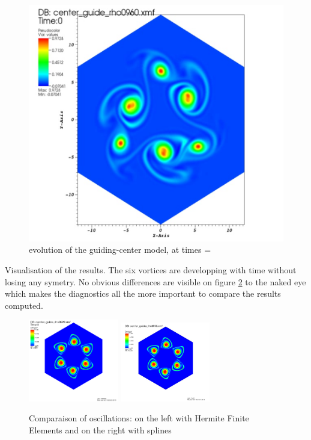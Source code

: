 \documentclass[proc]{edpsmath}
\begin{document}
\begin{figure}[h!]
	\includegraphics[scale=0.15]{figures/gc_spl_5.png}
	\caption{\label{fig:mode9}  evolution of the guiding-center model, at times = }
\end{figure}


Visualisation of the results. The six vortices are developping with time without losing any symetry. No obvious differences are visible on figure \ref{fig:comp_osci} to the naked eye which makes the diagnostics all the more important to compare the results computed.

\begin{figure}[h!]
	\includegraphics[width=0.35\textwidth]{figures/oscillations_hermite.png}
	\includegraphics[width=0.35\textwidth]{figures/oscillations_splines.png}
	\caption{\label{fig:comp_osci} Comparaison of oscillations: on the left with Hermite Finite Elements and on the right with splines}
\end{figure}
\end{document}
